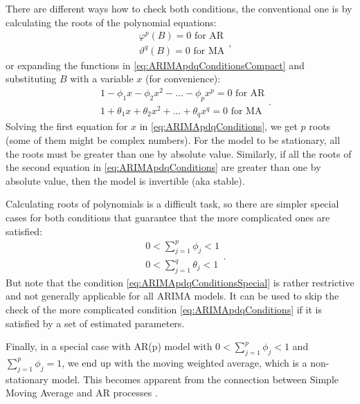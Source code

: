 \documentclass[
]{book}
\theoremstyle{definition}
\theoremstyle{definition}
\theoremstyle{definition}
\theoremstyle{definition}
\theoremstyle{remark}
\begin{document}
There are different ways how to check both conditions, the conventional one is by calculating the roots of the polynomial equations:
\begin{equation}
\begin{aligned}
  & \varphi^p(B) = 0 \text{ for AR} \\
  & \vartheta^q(B) = 0 \text{ for MA}
\end{aligned} ,
  \label{eq:ARIMApdqConditionsCompact}
\end{equation}
or expanding the functions in \eqref{eq:ARIMApdqConditionsCompact} and substituting \(B\) with a variable \(x\) (for convenience):
\begin{equation}
\begin{aligned}
  & 1 -\phi_1 x -\phi_2 x^2 -\dots -\phi_p x^p = 0 \text{ for AR} \\
  & 1 + \theta_1 x + \theta_2 x^2 + \dots + \theta_q x^q = 0 \text{ for MA}
\end{aligned} .
  \label{eq:ARIMApdqConditions}
\end{equation}
Solving the first equation for \(x\) in \eqref{eq:ARIMApdqConditions}, we get \(p\) roots (some of them might be complex numbers). For the model to be stationary, all the roots must be greater than one by absolute value. Similarly, if all the roots of the second equation in \eqref{eq:ARIMApdqConditions} are greater than one by absolute value, then the model is invertible (aka stable).

Calculating roots of polynomials is a difficult task, so there are simpler special cases for both conditions that guarantee that the more complicated ones are satisfied:
\begin{equation}
\begin{aligned}
  & 0 < \sum_{j=1}^p \phi_j < 1 \\
  & 0 < \sum_{j=1}^q \theta_j < 1
\end{aligned} .
  \label{eq:ARIMApdqConditionsSpecial}
\end{equation}
But note that the condition \eqref{eq:ARIMApdqConditionsSpecial} is rather restrictive and not generally applicable for all ARIMA models. It can be used to skip the check of the more complicated condition \eqref{eq:ARIMApdqConditions} if it is satisfied by a set of estimated parameters.

Finally, in a special case with AR(p) model with \(0 < \sum_{j=1}^p \phi_j < 1\) and \(\sum_{j=1}^p \phi_j = 1\), we end up with the moving weighted average, which is a non-stationary model. This becomes apparent from the connection between Simple Moving Average and AR processes \citep{Svetunkov2017}.
\end{document}
